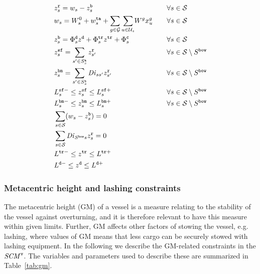 \begin{alignat}{3}    
& z^{\ttt{r}}_{s} = w_{s} - z^{\ttt{b}}_{s}														&& \forall s\in\mc{S} \label{defResF} \\
& w_{s} = W^{0}_{s} + w^{\ttt{ta}}_{s} + \sum_{g\in \mc{G}} \so[r]{\sum_{u\in \mc{U}_s}}W^g x^{g}_{u} \quad
																																			&& \forall s\in\mc{S} \label{defW} \\
& z^{\ttt{b}}_{s} = \Phi^{\ttt{d}}_{s} z^\ttt{d} + \Phi^{\ttt{tr}}_{s} z^\ttt{tr} + \Phi^{\ttt{c}}_{s} 	
																																			&& \forall s\in\mc{S} \label{defBancy} \\
%                                                                             
& z^{\ttt{sf}}_{s} = \sum_{s'\in S^\ttt{a}_s} z^{\ttt{r}}_{s'}				&& \forall s\in\mc{S}\setminus S^\ttt{bow} \label{defShear} \\
& z^\ttt{bm}_s = \sum_{s'\in S^\ttt{a}_s} \mi{Di}_{ss'} z^\ttt{r}_{s'}&& \forall s\in\mc{S}\setminus S^\ttt{bow} \label{defBending} \\
& L^{\ttt{sf}-}_{s} \leq z^{\ttt{sf}}_{s} \leq L^{\ttt{sf}+}_{s}		 	&& \forall s\in\mc{S}\setminus S^\ttt{bow} \label{limitsShear} \\    
& L^{\ttt{bm}-}_{s} \leq z^{\ttt{bm}}_{s} \leq L^{\ttt{bm}+}_{s}  		&& \forall s\in\mc{S}\setminus S^\ttt{bow} \label{limitsBending}\\
& \sum_{s\in\mc{S}} (w_{s}-z^\ttt{b}_s)  = 0													&& \label{noShearAtEnds} \\
& \sum_{s\in\mc{S}} \mi{Di}_{S^\ttt{bow}s} z^{\ttt{r}}_{s} = 0				&& \label{noMomentAtStern}\\
& L^{\ttt{tr}-}  		\leq z^\ttt{tr}    		\leq L^{\ttt{tr}+}					&& \label{trimLimits} \\
& L^{\ttt{d}-}	   	\leq z^\ttt{d}     		\leq L^{\ttt{d}+}						&& \label{draftLimits}
\end{alignat}

\subsubsection{Metacentric height and lashing constraints}
The metacentric height (GM) of a vessel is a measure relating to the stability of the vessel against overturning, and it is therefore relevant to have this measure within given limits. Further, GM affects other factors of stowing the vessel, e.g. lashing, where  values of GM means that less cargo can be securely stowed with lashing equipment. In the following we describe the GM-related constraints in the $\mathit{SCM}^\texttt{v}$. The variables and parameters used to describe these are summarized in Table~\ref{tab:gm}.

